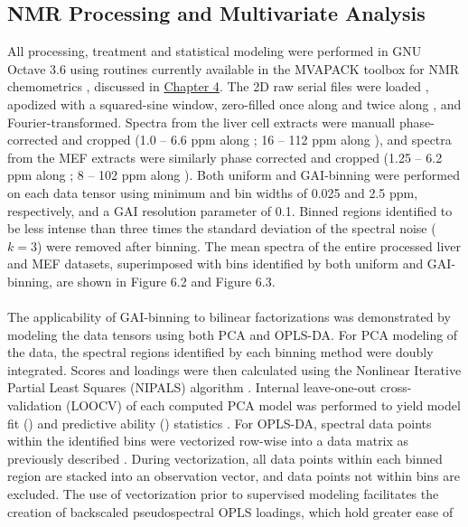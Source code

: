 \subsection{NMR Processing and Multivariate Analysis}

\begin{doublespace}
All processing, treatment and statistical modeling were performed in GNU Octave
3.6 \cite{eaton2008} using routines currently available in the MVAPACK
toolbox for NMR chemometrics \cite{worley:acscb2014}, discussed in
\hyperlink{chapter.4}{Chapter 4}. The 2D raw serial files were loaded
\cite{delaglio:jbnmr1995}, apodized with a squared-sine window,
zero-filled once along \hnmr{} and twice along \cnmr{}, and
Fourier-transformed. Spectra from the liver cell extracts were manuall
phase-corrected and cropped (1.0 -- 6.6 ppm along \hnmr{}; 16 -- 112 ppm
along \cnmr{}), and spectra from the MEF extracts were similarly phase
corrected and cropped (1.25 -- 6.2 ppm along \hnmr{}; 8 -- 102 ppm
along \cnmr{}). Both uniform and GAI-binning were performed on each data tensor
using minimum \hnmr{} and \cnmr{} bin widths of 0.025 and 2.5
ppm, respectively, and a GAI resolution parameter of 0.1. Binned regions
identified to be less intense than three times the standard deviation of the
spectral noise ($k = 3$) were removed after binning. The mean spectra of the
entire processed liver and MEF datasets, superimposed with bins identified by
both uniform and GAI-binning, are shown in Figure 6.2 and Figure 6.3.
\\\\
The applicability of GAI-binning to bilinear factorizations was demonstrated
by modeling the data tensors using both PCA and OPLS-DA. For PCA modeling of
the data, the spectral regions identified by each binning method were doubly
integrated. Scores and loadings were then calculated using the Nonlinear
Iterative Partial Least Squares (NIPALS) algorithm
\cite{jolliffe2002}. Internal leave-one-out cross-validation (LOOCV)
of each computed PCA model was performed to yield model fit (\rsqx{}) and
predictive ability (\qsq{}) statistics
\cite{krzanowski:biom1987,eshghi:cils2014}. For OPLS-DA, spectral data
points within the identified bins were vectorized row-wise into a data matrix
as previously described \cite{hedenstrom:cils2008}. During
vectorization, all data points within each binned region are stacked into an
observation vector, and data points not within bins are excluded. The use of
vectorization prior to supervised modeling facilitates the creation of
backscaled pseudospectral OPLS loadings, which hold greater ease of

\end{doublespace}
